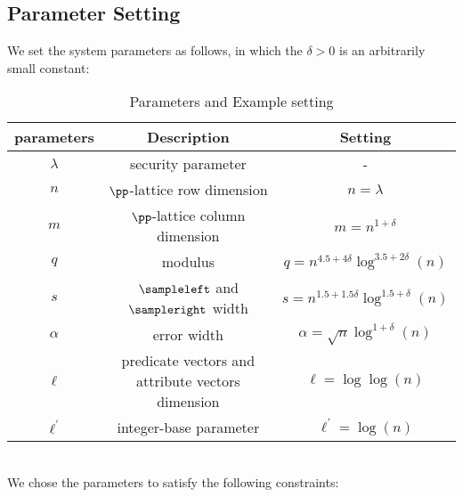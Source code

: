\subsection{Parameter Setting}
We set the system parameters as follows, in which the $\delta>0$ is an arbitrarily small constant:
\begin{table}[htbp]
\centering
\begin{tabular}{|c|c|c|}
\hline parameters & Description & Setting\\
\hline $\lambda$ & security parameter & -\\
\hline $n$ & $\pp$-lattice row dimension & $n=\lambda$\\
\hline $m$ & $\pp$-lattice column dimension & $m=n^{1+\delta}$\\
\hline $q$ & modulus & $q=n^{4.5+4\delta}\log^{3.5+2\delta}(n)$\\
\hline $s$ & $\sampleleft$ and $\sampleright$ width & $s=n^{1.5+1.5\delta}\log^{1.5+\delta}(n)$\\
\hline $\alpha$ & error width & $\alpha=\sqrt{n}\log^{1+\delta}(n)$\\
\hline $\ell$ & predicate vectors and attribute vectors dimension & $\ell=\log\log(n)$\\
\hline $\ell^{'}$ & integer-base parameter & $\ell^{'}=\log(n)$\\
\hline
\end{tabular}
\caption{Parameters and Example setting}
\end{table}\\[0.4cm]
We chose the parameters to satisfy the following constraints:
